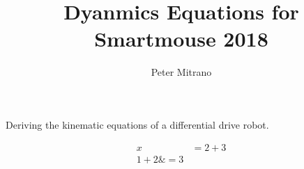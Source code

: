 \documentclass{article}
\begin{document}
\title{Dyanmics Equations for Smartmouse 2018}
\author{Peter Mitrano}

\maketitle

Deriving the kinematic equations of a differential drive robot.

\begin{align*}
  x &= 2 + 3 \\
  1 + 2 \& = 3 \\
\end{align*}
\end{document}
